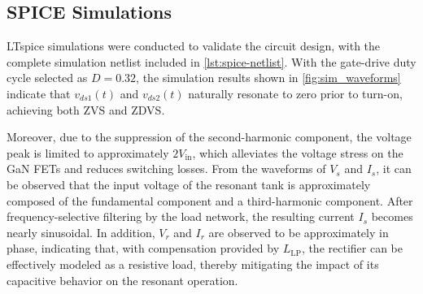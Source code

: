 \documentclass[journal, 9pt, letterpaper, english]{IEEEtran}[2015/08/26]
\begin{document}
\subsection{SPICE Simulations}
LTspice simulations were conducted to validate the circuit design, with the complete simulation netlist included in \cref{lst:spice-netlist}.
With the gate-drive duty cycle selected as $D = 0.32$, the simulation results shown in \cref{fig:sim_waveforms} indicate that $v_{ds1}(t)$ and $v_{ds2}(t)$ naturally resonate to zero prior to turn-on, achieving both ZVS and ZDVS.
\par
Moreover, due to the suppression of the second-harmonic component, the voltage peak is limited to approximately $2V_{\mathrm{in}}$, which alleviates the voltage stress on the GaN FETs and reduces switching losses.
From the waveforms of $V_s$ and $I_s$, it can be observed that the input voltage of the resonant tank is approximately composed of the fundamental component and a third-harmonic component.
After frequency-selective filtering by the load network, the resulting current $I_s$ becomes nearly sinusoidal.
In addition, $V_r$ and $I_r$ are observed to be approximately in phase, indicating that, with compensation provided by $L_{\mathrm{LP}}$, the rectifier can be effectively modeled as a resistive load, thereby mitigating the impact of its capacitive behavior on the resonant operation.
\end{document}
